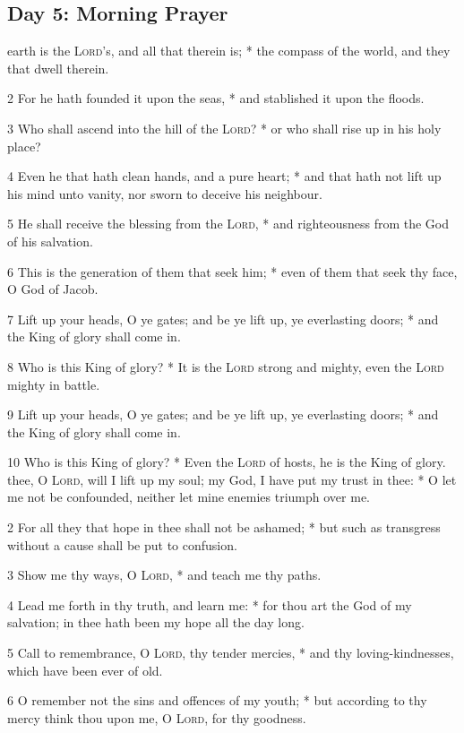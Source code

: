 \subsection{Day 5: Morning Prayer}
 earth is the {\textsc{Lord}}'s, and all that therein is; * the compass of the world, and they that dwell therein.\par
2 For he hath founded it upon the seas, * and stablished it upon the floods.\par
3 Who shall ascend into the hill of the {\textsc{Lord}}? * or who shall rise up in his holy place?\par
4 Even he that hath clean hands, and a pure heart; * and that hath not lift up his mind unto vanity, nor sworn to deceive his neighbour.\par
5 He shall receive the blessing from the {\textsc{Lord}}, * and righteousness from the God of his salvation.\par
6 This is the generation of them that seek him; * even of them that seek thy face, O God of Jacob.\par
7 Lift up your heads, O ye gates; and be ye lift up, ye everlasting doors; * and the King of glory shall come in.\par
8 Who is this King of glory? * It is the {\textsc{Lord}} strong and mighty, even the {\textsc{Lord}} mighty in battle.\par
9 Lift up your heads, O ye gates; and be ye lift up, ye everlasting doors; * and the King of glory shall come in.\par
10 Who is this King of glory? * Even the {\textsc{Lord}} of hosts, he is the King of glory.
 thee, O {\textsc{Lord}}, will I lift up my soul; my God, I have put my trust in thee: * O let me not be confounded, neither let mine enemies triumph over me.\par
2 For all they that hope in thee shall not be ashamed; * but such as transgress without a cause shall be put to confusion.\par
3 Show me thy ways, O {\textsc{Lord}}, * and teach me thy paths.\par
4 Lead me forth in thy truth, and learn me: * for thou art the God of my salvation; in thee hath been my hope all the day long.\par
5 Call to remembrance, O {\textsc{Lord}}, thy tender mercies, * and thy loving-kindnesses, which have been ever of old.\par
6 O remember not the sins and offences of my youth; * but according to thy mercy think thou upon me, O {\textsc{Lord}}, for thy goodness.\par
